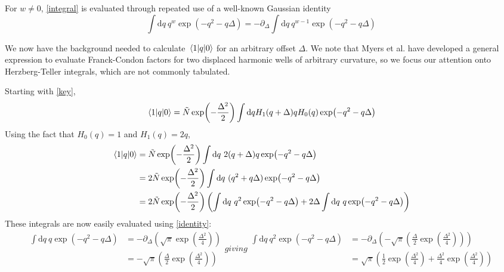 \documentclass[aip, jcp, reprint, onecolumn, nofootinbib]{revtex4-2}
\begin{document}
For $w \neq 0$, \autoref{integral} is evaluated through repeated use of a well-known Gaussian identity
\begin{equation}\label{identity}
	\int \mathrm{d}q \ q^w \exp(-q^2 - q\Delta) = -\partial_{\Delta} \int \mathrm{d}q \ q^{w-1} \exp(-q^2 - q\Delta)
\end{equation}

We now have the background needed to calculate $\mel{1}{q}{0}$ for an arbitrary offset $\Delta$.
We note that Myers et al. have developed a general expression to evaluate Franck-Condon factors for two displaced harmonic wells of arbitrary curvature,\cite{Myers1982} so we focus our attention onto Herzberg-Teller integrals, which are not commonly tabulated.

Starting with \autoref{key},
\begin{equation}
\begin{split}
	\mel{1}{q}{0} = \tilde{N} \exp(-\frac{\Delta^2}{2}) \int \mathrm{d}q H_1(q+\Delta) q H_0(q) \exp(-q^2 - q\Delta)
\end{split}
\end{equation}
Using the fact that $H_0(q) = 1$ and $H_1(q) = 2q$, 
\begin{equation}\label{HT10}
	\begin{split}
		\mel{1}{q}{0} &= \tilde{N} \exp(-\frac{\Delta^2}{2}) \int \mathrm{d}q \ 2(q + \Delta) q \exp(-q^2 - q\Delta)\\
		&= 2\tilde{N} \exp(-\frac{\Delta^2}{2}) \int \mathrm{d}q \ (q^2 + q \Delta) \exp(-q^2 - q\Delta)\\
		&=  2\tilde{N} \exp(-\frac{\Delta^2}{2}) \left(\int \mathrm{d}q \ q^2 \exp(-q^2 - q\Delta) + 2\Delta \int \mathrm{d}q \ q \exp(-q^2 - q\Delta) \right)
	\end{split}
\end{equation}
These integrals are now easily evaluated using \autoref{identity}:
\begin{subequations}\label{evalGaussians}
	\begin{equation}
		\begin{split}
					\int \mathrm{d}q \ q \exp(-q^2 - q\Delta) &= -\partial_{\Delta} \left(\sqrt{\pi} \exp(\frac{\Delta^2}{4})\right)\\
					& = -\sqrt{\pi} \left(\frac{\Delta}{2} \exp(\frac{\Delta^2}{4})\right)
		\end{split}
	\end{equation}
giving
\begin{equation}
	\begin{split}
		\int \mathrm{d}q \ q^2 \exp(-q^2 - q\Delta) &= -\partial_{\Delta} \left(-\sqrt{\pi} \left(\frac{\Delta}{2} \exp(\frac{\Delta^2}{4})\right)\right)\\
		& =\sqrt{\pi} \left(\frac{1}{2}\exp(\frac{\Delta^2}{4}) + \frac{\Delta^2}{4} \exp(\frac{\Delta^2}{4})\right)
	\end{split}
\end{equation}
\end{subequations}
\end{document}
